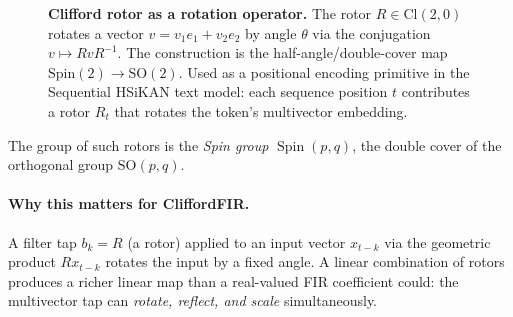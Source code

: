 \documentclass[11pt,a4paper]{article}
\theoremstyle{remark}
\DeclareMathOperator{\Spin}{Spin}
\newcommand{\Cl}[2]{\mathrm{Cl}(#1, #2)}
\begin{document}
\begin{figure}[h]
\centering
{}
\caption{\textbf{Clifford rotor as a rotation operator.} The
rotor $R \in \Cl{2}{0}$ rotates a vector $v = v_1 e_1 + v_2 e_2$
by angle $\theta$ via the conjugation $v \mapsto R v R^{-1}$.
The construction is the half-angle/double-cover map
$\mathrm{Spin}(2) \to \mathrm{SO}(2)$. Used as a positional
encoding primitive in the Sequential HSiKAN text model: each
sequence position $t$ contributes a rotor $R_t$ that rotates the
token's multivector embedding.}
\label{fig:clifford-rotor}
\end{figure}

The group of such rotors is the \emph{Spin group} $\Spin(p, q)$,
the double cover of the orthogonal group $\mathrm{SO}(p, q)$.

\paragraph{Why this matters for CliffordFIR.} A filter tap $b_k =
R$ (a rotor) applied to an input vector $x_{t-k}$ via the
geometric product $R x_{t-k}$ rotates the input by a fixed angle.
A linear combination of rotors produces a richer linear map than
a real-valued FIR coefficient could: the multivector tap can
\emph{rotate, reflect, and scale} simultaneously.
\end{document}
